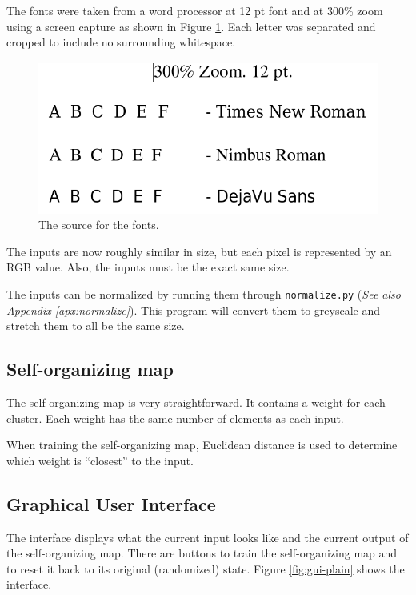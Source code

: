 \documentclass[12pt,letterpaper,oneside]{report}
\newcommand \code[1]{\texttt{#1}}
\newcommand \qq[1]{``{#1}''}
\begin{document}
The fonts were taken from a word processor at 12 pt font and at 300\% zoom using a screen capture as shown in Figure \ref{fig:font-screengrab}. Each letter was separated and cropped to include no surrounding whitespace.

\begin{figure}[h]
  \centering
  \includegraphics[width=5in]{diagrams/font-screengrab.png}
  \caption{The source for the fonts.}
  \label{fig:font-screengrab}
\end{figure}

The inputs are now roughly similar in size, but each pixel is represented by an RGB value. Also, the inputs must be the exact same size.

The inputs can be normalized by running them through \code{normalize.py} (\textit{See also Appendix \ref{apx:normalize}}). This program will convert them to greyscale and stretch them to all be the same size.


\subsection{Self-organizing map}
The self-organizing map is very straightforward. It contains a weight for each cluster. Each weight has the same number of elements as each input.

When training the self-organizing map, Euclidean distance is used to determine which weight is \qq{closest} to the input.


\subsection{Graphical User Interface}
The interface displays what the current input looks like and the current output of the self-organizing map. There are buttons to train the self-organizing map and to reset it back to its original (randomized) state. Figure \ref{fig:gui-plain} shows the interface.
\end{document}
